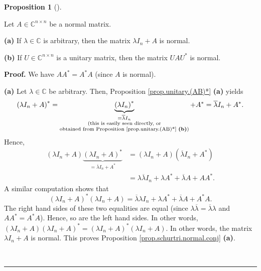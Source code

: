 \documentclass[numbers=enddot,12pt,final,onecolumn,notitlepage]{scrartcl}%
\numberwithin{exer}{subsection}
\theoremstyle{definition}
\newtheorem{prop}[theo]{Proposition}
\newenvironment{proposition}[1][]
{\begin{prop}[#1]\begin{leftbar}}
{\end{leftbar}\end{prop}}
\newenvironment{proof}[1][Proof]{\noindent\textbf{#1.} }{\ \rule{0.5em}{0.5em}}
\begin{document}
\begin{proposition}
\label{prop.schurtri.normal.conj}Let $A\in\mathbb{C}^{n\times n}$ be a normal
matrix. \medskip

\textbf{(a)} If $\lambda\in\mathbb{C}$ is arbitrary, then the matrix $\lambda
I_{n}+A$ is normal. \medskip

\textbf{(b)} If $U\in\mathbb{C}^{n\times n}$ is a unitary matrix, then the
matrix $UAU^{\ast}$ is normal.
\end{proposition}

\begin{proof}
We have $AA^{\ast}=A^{\ast}A$ (since $A$ is normal). \medskip

\textbf{(a)} Let $\lambda\in\mathbb{C}$ be arbitrary. Then, Proposition
\ref{prop.unitary.(AB)*} \textbf{(a)} yields%
\[
\left(  \lambda I_{n}+A\right)  ^{\ast}=\underbrace{\left(  \lambda
I_{n}\right)  ^{\ast}}_{\substack{=\overline{\lambda}I_{n}\\\text{(this is
easily seen directly, or}\\\text{obtained from Proposition
\ref{prop.unitary.(AB)*} \textbf{(b)})}}}+A^{\ast}=\overline{\lambda}%
I_{n}+A^{\ast}.
\]
Hence,
\begin{align*}
\left(  \lambda I_{n}+A\right)  \underbrace{\left(  \lambda I_{n}+A\right)
^{\ast}}_{=\overline{\lambda}I_{n}+A^{\ast}}  &  =\left(  \lambda
I_{n}+A\right)  \left(  \overline{\lambda}I_{n}+A^{\ast}\right) \\
&  =\lambda\overline{\lambda}I_{n}+\lambda A^{\ast}+\overline{\lambda
}A+AA^{\ast}.
\end{align*}
A similar computation shows that%
\[
\left(  \lambda I_{n}+A\right)  ^{\ast}\left(  \lambda I_{n}+A\right)
=\overline{\lambda}\lambda I_{n}+\lambda A^{\ast}+\overline{\lambda}A+A^{\ast
}A.
\]
The right hand sides of these two equalities are equal (since $\lambda
\overline{\lambda}=\overline{\lambda}\lambda$ and $AA^{\ast}=A^{\ast}A$).
Hence, so are the left hand sides. In other words, $\left(  \lambda
I_{n}+A\right)  \left(  \lambda I_{n}+A\right)  ^{\ast}=\left(  \lambda
I_{n}+A\right)  ^{\ast}\left(  \lambda I_{n}+A\right)  $. In other words, the
matrix $\lambda I_{n}+A$ is normal. This proves Proposition
\ref{prop.schurtri.normal.conj} \textbf{(a)}. \medskip


\end{proof}
\end{document}
